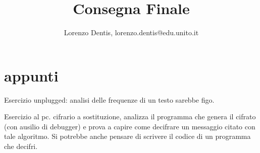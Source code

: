 \documentclass[a4paper]{article}
\begin{document}
\author{Lorenzo Dentis, lorenzo.dentis@edu.unito.it}
\title{Consegna Finale}
\maketitle
\section{appunti}
Esercizio unplugged: analisi delle frequenze di un testo sarebbe figo.

Esercizio al pc. cifrario a sostituzione, analizza il programma che genera il cifrato (con ausilio di debugger) e prova a capire come decifrare un messaggio citato con tale algoritmo. 
Si potrebbe anche pensare di scrivere il codice di un programma che decifri.
\end{document}
